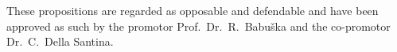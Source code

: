 \documentclass{propositions}
\begin{document}

\begin{center}
These propositions are regarded as opposable and defendable and have been approved as such by the promotor Prof.\ Dr.\ R.\ Babu\v{s}ka and the co-promotor Dr.\ C.\ Della Santina.
\end{center}




















\end{document}
